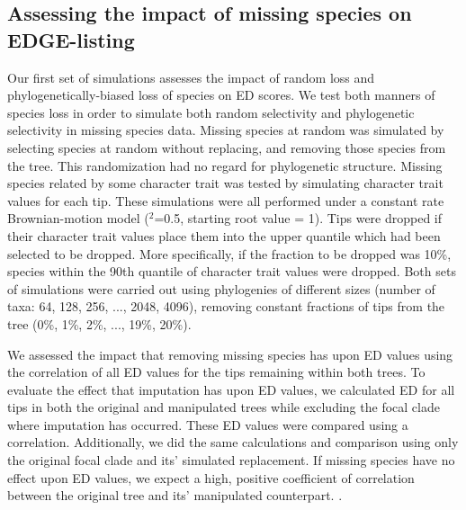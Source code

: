 \documentclass[12pt,english]{article}
\begin{document}

\subsection*{Assessing the impact of missing species on EDGE-listing}
Our first set of simulations assesses the impact of random loss and
phylogenetically-biased loss of species on ED scores. We test both manners of
species loss in order to simulate both random selectivity and phylogenetic
selectivity in missing species data. Missing species at random was simulated by
selecting species at random without replacing, and removing those species from
the tree. This randomization had no regard for phylogenetic structure. Missing
species related by some character trait was tested by simulating character trait
values for each tip. These simulations were all performed under a constant rate
Brownian-motion model (\sigma$^2$=0.5, starting root value = 1). Tips were
dropped if their character trait values place them into the upper quantile which
had been selected to be dropped. More specifically, if the fraction to be
dropped was 10\%, species within the 90th quantile of character trait values
were dropped. Both sets of simulations were carried out using phylogenies of
different sizes (number of taxa: 64, 128, 256, ..., 2048, 4096), removing
constant fractions of tips from the tree (0\%, 1\%, 2\%, ..., 19\%, 20\%).

We assessed the impact that removing missing species has upon ED values using
the correlation of all ED values for the tips remaining within both trees. To
evaluate the effect that imputation has upon ED values, we calculated ED for all
tips in both the original and manipulated trees while excluding the focal clade
where imputation has occurred. These ED values were compared using a
correlation. Additionally, we did the same calculations and comparison using
only the original focal clade and its' simulated replacement. If missing species
have no effect upon ED values, we expect a high, positive coefficient of
correlation between the original tree and its' manipulated counterpart.
. 

\end{document}
